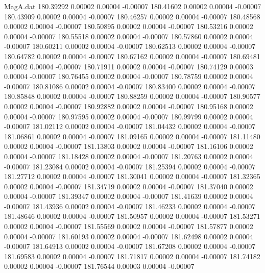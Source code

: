 \begin{filecontents}{MagA.dat}
 180.39292    0.00002    0.00004   -0.00007
 180.41602    0.00002    0.00004   -0.00007
 180.43909    0.00002    0.00004   -0.00007
 180.46257    0.00002    0.00004   -0.00007
 180.48568    0.00002    0.00004   -0.00007
 180.50895    0.00002    0.00004   -0.00007
 180.53216    0.00002    0.00004   -0.00007
 180.55518    0.00002    0.00004   -0.00007
 180.57860    0.00002    0.00004   -0.00007
 180.60211    0.00002    0.00004   -0.00007
 180.62513    0.00002    0.00004   -0.00007
 180.64782    0.00002    0.00004   -0.00007
 180.67162    0.00002    0.00004   -0.00007
 180.69481    0.00002    0.00004   -0.00007
 180.71911    0.00002    0.00004   -0.00007
 180.74129    0.00003    0.00004   -0.00007
 180.76455    0.00002    0.00004   -0.00007
 180.78759    0.00002    0.00004   -0.00007
 180.81086    0.00002    0.00004   -0.00007
 180.83400    0.00002    0.00004   -0.00007
 180.85848    0.00002    0.00004   -0.00007
 180.88259    0.00002    0.00004   -0.00007
 180.90577    0.00002    0.00004   -0.00007
 180.92882    0.00002    0.00004   -0.00007
 180.95168    0.00002    0.00004   -0.00007
 180.97595    0.00002    0.00004   -0.00007
 180.99799    0.00002    0.00004   -0.00007
 181.02112    0.00002    0.00004   -0.00007
 181.04432    0.00002    0.00004   -0.00007
 181.06861    0.00002    0.00004   -0.00007
 181.09165    0.00002    0.00004   -0.00007
 181.11480    0.00002    0.00004   -0.00007
 181.13803    0.00002    0.00004   -0.00007
 181.16106    0.00002    0.00004   -0.00007
 181.18428    0.00002    0.00004   -0.00007
 181.20763    0.00002    0.00004   -0.00007
 181.23084    0.00002    0.00004   -0.00007
 181.25394    0.00002    0.00004   -0.00007
 181.27712    0.00002    0.00004   -0.00007
 181.30041    0.00002    0.00004   -0.00007
 181.32365    0.00002    0.00004   -0.00007
 181.34719    0.00002    0.00004   -0.00007
 181.37040    0.00002    0.00004   -0.00007
 181.39347    0.00002    0.00004   -0.00007
 181.41639    0.00002    0.00004   -0.00007
 181.43936    0.00002    0.00004   -0.00007
 181.46233    0.00002    0.00004   -0.00007
 181.48646    0.00002    0.00004   -0.00007
 181.50957    0.00002    0.00004   -0.00007
 181.53271    0.00002    0.00004   -0.00007
 181.55569    0.00002    0.00004   -0.00007
 181.57877    0.00002    0.00004   -0.00007
 181.60193    0.00002    0.00004   -0.00007
 181.62498    0.00002    0.00004   -0.00007
 181.64913    0.00002    0.00004   -0.00007
 181.67208    0.00002    0.00004   -0.00007
 181.69583    0.00002    0.00004   -0.00007
 181.71817    0.00002    0.00004   -0.00007
 181.74182    0.00002    0.00004   -0.00007
 181.76544    0.00003    0.00004   -0.00007

\end{filecontents}
